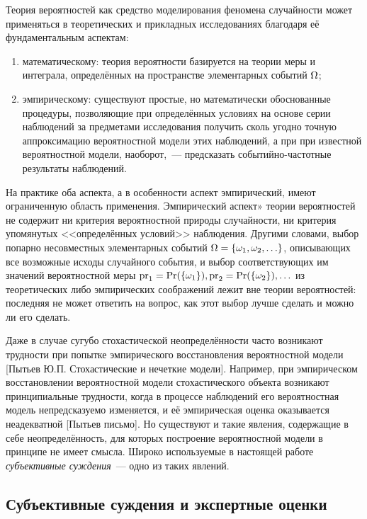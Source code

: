 Теория вероятностей как средство моделирования феномена случайности может применяться в теоретических и прикладных исследованиях благодаря её фундаментальным аспектам:
\begin{enumerate}
  \item математическому: теория вероятности базируется на теории меры и интеграла, определённых на пространстве элементарных событий $\Omega$;
  \item эмпирическому: существуют простые, но математически обоснованные процедуры, позволяющие при определённых условиях
на основе серии наблюдений за предметами исследования получить сколь угодно точную аппроксимацию вероятностной модели этих наблюдений, а при при известной вероятностной модели, наоборот,~--- предсказать событийно-частотные результаты наблюдений. 
\end{enumerate}

На практике оба аспекта, а в особенности аспект эмпирический, имеют ограниченную область применения.  Эмпирический аспект» теории вероятностей не содержит ни критерия вероятностной природы случайности, ни критерия упомянутых <<определённых условий>> наблюдения. Другими словами, выбор попарно несовместных элементарных событий $\Omega = \{\omega_1, \omega_2, \ldots\}$, описывающих все возможные исходы случайного события, и выбор соответствующих им значений вероятностной меры ${\mathrm{pr}}_1 = {\mathrm{Pr}}(\{\omega_1\}), {\mathrm{pr}}_2 = {\mathrm{Pr}}(\{\omega_2\}), \ldots$ из теоретических либо эмпирических соображений лежит вне теории вероятностей: последняя не может ответить на вопрос, как этот выбор лучше сделать и можно ли его сделать.

Даже в случае сугубо стохастической неопределённости часто возникают трудности при попытке эмпирического восстановления вероятностной модели [Пытьев Ю.П. Стохастические и нечеткие модели]. Например, при эмпирическом восстановлении вероятностной модели стохастического объекта возникают принципиальные трудности, когда в процессе наблюдений его вероятностная модель непредсказуемо изменяется, и её эмпирическая оценка оказывается неадекватной [Пытьев письмо]. Но существуют и такие явления, содержащие в себе неопределённость, для которых построение вероятностной модели в принципе не имеет смысла. Широко используемые в настоящей работе {\sl субъективные суждения}~--- одно из таких явлений. 

\subsection{Субъективные суждения и экспертные оценки}
\label{sec:intro_subjective}

